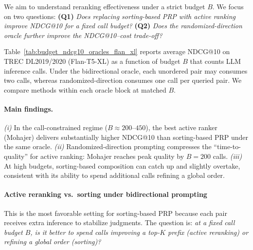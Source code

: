 \documentclass[11pt]{article}
\begin{document}

We aim to understand reranking effectiveness under a strict budget $B$.
We focus on two questions:
\textbf{(Q1)} \emph{Does replacing sorting-based PRP with active ranking improve NDCG@10 for a fixed call budget?}
\textbf{(Q2)} \emph{Does the randomized-direction oracle further improve the NDCG@10--cost trade-off?}

Table~\ref{tab:budget_ndcg10_oracles_flan_xl} reports average NDCG@10 on TREC DL2019/2020 (Flan-T5-XL) as a function of budget $B$ that counts LLM inference calls. Under the bidirectional oracle, each unordered pair may consumes two calls, whereas randomized-direction consumes one call per queried pair.
We compare methods within each oracle block at matched $B$.

\paragraph{Main findings.}
\emph{(i)} In the call-constrained regime ($B \approx 200$--$450$), the best active ranker (Mohajer) delivers substantially higher NDCG@10 than sorting-based PRP under the same oracle.
\emph{(ii)} Randomized-direction prompting compresses the ``time-to-quality'' for active ranking: Mohajer reaches peak quality by $B{=}200$ calls.
\emph{(iii)} At high budgets, sorting-based composition can catch up and slightly overtake, consistent with its ability to spend additional calls refining a global order.

\paragraph{Active reranking vs.\ sorting under bidirectional prompting}
\label{sec:ar-vs-sorting}

This is the most favorable setting for sorting-based PRP because each pair receives extra inference to stabilize judgments. The question is: \emph{at a fixed call budget $B$, is it better to spend calls improving a top-$K$ prefix (active reranking) or refining a global order (sorting)?}
\end{document}

